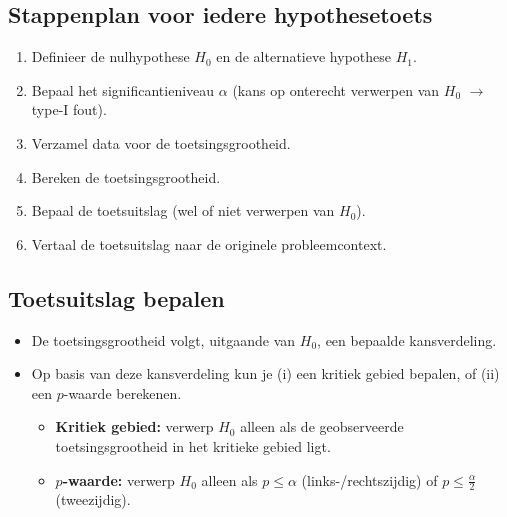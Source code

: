 \subsection*{Stappenplan voor iedere hypothesetoets}
\begin{enumerate}
    \item Definieer de nulhypothese $H_0$ en de alternatieve hypothese $H_1$.
    \item Bepaal het significantieniveau $\alpha$ (kans op onterecht verwerpen van $H_0$ $\rightarrow$ type-I fout).
    \item Verzamel data voor de toetsingsgrootheid.
    \item Bereken de toetsingsgrootheid.
    \item Bepaal de toetsuitslag (wel of niet verwerpen van $H_0$).
    \item Vertaal de toetsuitslag naar de originele probleemcontext.
\end{enumerate}

\newpage 

\subsection*{Toetsuitslag bepalen}
\begin{itemize}
    \item De toetsingsgrootheid volgt, uitgaande van $H_0$, een bepaalde kansverdeling.
    \item Op basis van deze kansverdeling kun je (i) een kritiek gebied bepalen, of (ii) een $p$-waarde berekenen.
    \begin{itemize}
        \item \textbf{Kritiek gebied:} verwerp $H_0$ alleen als de geobserveerde toetsingsgrootheid in het kritieke gebied ligt.
        \item \textbf{$p$-waarde:} verwerp $H_0$ alleen als $p \le \alpha$ (links-/rechtszijdig) of $p \le \frac{\alpha}{2}$ (tweezijdig).
    \end{itemize}
\end{itemize}

